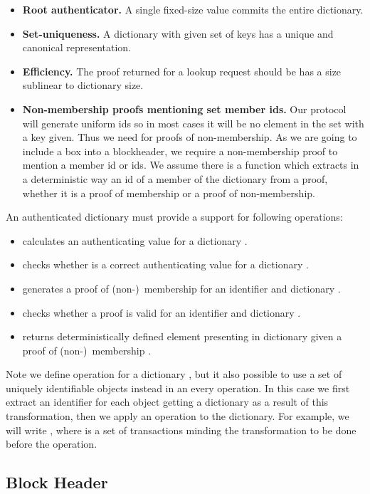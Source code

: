 \documentclass[conference,compsoc]{IEEEtran}
\begin{document}
\begin{itemize}
\item \textbf{Root authenticator.} A single fixed-size value commits the entire dictionary.
\item \textbf{Set-uniqueness.} A dictionary with given set of keys has a unique and canonical representation.
\item \textbf{Efficiency.} The proof returned for a lookup request should be has a size sublinear to dictionary size.
\item \textbf{Non-membership proofs mentioning set member ids.} Our protocol will generate uniform ids so in most cases it will be no element in the set with a key given. Thus we need for proofs of non-membership. As we are going to include a box into a blockheader, we require a non-membership proof to mention a member id or ids. We assume there is a function  which extracts in a deterministic way an id of a member of the dictionary from a proof, whether it is a proof of membership or a proof of non-membership.
\end{itemize}

An authenticated dictionary must provide a support for following operations:

\begin{itemize}
\item{} calculates an authenticating value for a dictionary .
\item{} checks whether  is a correct authenticating value for a dictionary .
\item{} generates a proof  of (non-)~membership for an identifier  and dictionary .
\item{} checks whether a proof  is valid for an identifier  and dictionary .
\item{} returns deterministically defined element presenting in dictionary  given a proof of (non-)~membership .
\end{itemize}

Note we define operation for a dictionary , but it also possible to use a set of uniquely identifiable objects instead in an every operation. In this case we first extract an identifier for each object getting a dictionary as a result of this transformation, then we apply an operation to the dictionary. For example, we will write , where  is a set of transactions minding the transformation to be done before the operation.

\subsection{Block Header}
\end{document}
